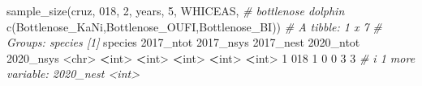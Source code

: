\documentclass[
]{book}
\newenvironment{Shaded}{\begin{snugshade}}{\end{snugshade}}
\newcommand{\AttributeTok}[1]{\textcolor[rgb]{0.77,0.63,0.00}{#1}}
\newcommand{\CommentTok}[1]{\textcolor[rgb]{0.56,0.35,0.01}{\textit{#1}}}
\newcommand{\DecValTok}[1]{\textcolor[rgb]{0.00,0.00,0.81}{#1}}
\newcommand{\ErrorTok}[1]{\textcolor[rgb]{0.64,0.00,0.00}{\textbf{#1}}}
\newcommand{\FunctionTok}[1]{\textcolor[rgb]{0.00,0.00,0.00}{#1}}
\newcommand{\NormalTok}[1]{#1}
\newcommand{\SpecialCharTok}[1]{\textcolor[rgb]{0.00,0.00,0.00}{#1}}
\newcommand{\StringTok}[1]{\textcolor[rgb]{0.31,0.60,0.02}{#1}}
\begin{document}
\begin{Shaded}
\begin{Highlighting}[]
\FunctionTok{sample\_size}\NormalTok{(cruz, }\StringTok{\textquotesingle{}018\textquotesingle{}}\NormalTok{, }\DecValTok{2}\NormalTok{, years, }\DecValTok{5}\NormalTok{, }\StringTok{\textquotesingle{}WHICEAS\textquotesingle{}}\NormalTok{, }\CommentTok{\# bottlenose dolphin}
            \FunctionTok{c}\NormalTok{(}\StringTok{\textquotesingle{}Bottlenose\_KaNi\textquotesingle{}}\NormalTok{,}\StringTok{\textquotesingle{}Bottlenose\_OUFI\textquotesingle{}}\NormalTok{,}\StringTok{\textquotesingle{}Bottlenose\_BI\textquotesingle{}}\NormalTok{))}
\CommentTok{\# A tibble: 1 x 7}
\CommentTok{\# Groups:   species [1]}
\NormalTok{  species }\StringTok{\textasciigrave{}}\AttributeTok{2017\_ntot}\StringTok{\textasciigrave{}} \StringTok{\textasciigrave{}}\AttributeTok{2017\_nsys}\StringTok{\textasciigrave{}} \StringTok{\textasciigrave{}}\AttributeTok{2017\_nest}\StringTok{\textasciigrave{}} \StringTok{\textasciigrave{}}\AttributeTok{2020\_ntot}\StringTok{\textasciigrave{}} \StringTok{\textasciigrave{}}\AttributeTok{2020\_nsys}\StringTok{\textasciigrave{}}
  \SpecialCharTok{\textless{}}\NormalTok{chr}\SpecialCharTok{\textgreater{}}         \ErrorTok{\textless{}}\NormalTok{int}\SpecialCharTok{\textgreater{}}       \ErrorTok{\textless{}}\NormalTok{int}\SpecialCharTok{\textgreater{}}       \ErrorTok{\textless{}}\NormalTok{int}\SpecialCharTok{\textgreater{}}       \ErrorTok{\textless{}}\NormalTok{int}\SpecialCharTok{\textgreater{}}       \ErrorTok{\textless{}}\NormalTok{int}\SpecialCharTok{\textgreater{}}
\DecValTok{1} \DecValTok{018}               \DecValTok{1}           \DecValTok{0}           \DecValTok{0}           \DecValTok{3}           \DecValTok{3}
\CommentTok{\# i 1 more variable: \textasciigrave{}2020\_nest\textasciigrave{} \textless{}int\textgreater{}}


\end{Highlighting}
\end{Shaded}
\end{document}
